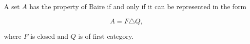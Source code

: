 A set $A$ has the property of Baire if and only if it can be represented in the form

$$A = F \triangle Q,$$

where $F$ is closed and $Q$ is of first category.

